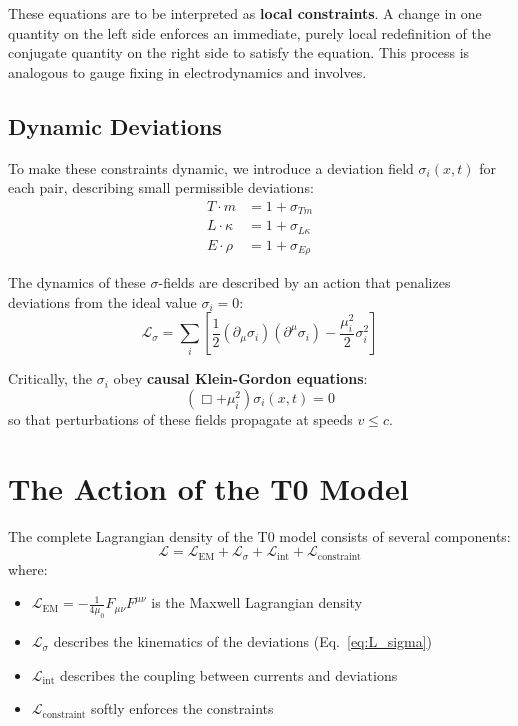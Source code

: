 	These equations are to be interpreted as \textbf{local constraints}. A change in one quantity on the left side enforces an immediate, purely local redefinition of the conjugate quantity on the right side to satisfy the equation. This process is analogous to gauge fixing in electrodynamics and involves.
	
	\subsection{Dynamic Deviations}
	To make these constraints dynamic, we introduce a deviation field $\sigma_i(x,t)$ for each pair, describing small permissible deviations:
	\begin{align}
		T \cdot m &= 1 + \sigma_{Tm} \label{eq:sigma_tm} \\
		L \cdot \kappa &= 1 + \sigma_{L\kappa} \label{eq:sigma_lk} \\
		E \cdot \rho &= 1 + \sigma_{E\rho} \label{eq:sigma_er}
	\end{align}
	
	The dynamics of these $\sigma$-fields are described by an action that penalizes deviations from the ideal value $\sigma_i = 0$:
	\begin{equation}
		\mathcal{L}_{\sigma} = \sum_i \left[ \frac{1}{2} (\partial_\mu \sigma_i)(\partial^\mu \sigma_i) - \frac{\mu_i^2}{2} \sigma_i^2 \right] \label{eq:L_sigma}
	\end{equation}
	
	Critically, the $\sigma_i$ obey \textbf{causal Klein-Gordon equations}:
	\begin{equation}
		(\Box + \mu_i^2) \sigma_i(x,t) = 0 \label{eq:kg}
	\end{equation}
	so that perturbations of these fields propagate at speeds $v \leq c$.
	
	\section{The Action of the T0 Model}
	The complete Lagrangian density of the T0 model consists of several components:
	\begin{equation}
		\mathcal{L} = \mathcal{L}_{\text{EM}} + \mathcal{L}_{\sigma} + \mathcal{L}_{\text{int}} + \mathcal{L}_{\text{constraint}} \label{eq:full_L}
	\end{equation}
	where:
	\begin{itemize}
		\item $\mathcal{L}_{\text{EM}} = -\frac{1}{4\mu_0} F_{\mu\nu} F^{\mu\nu}$ is the Maxwell Lagrangian density
		\item $\mathcal{L}_{\sigma}$ describes the kinematics of the deviations (Eq.~\ref{eq:L_sigma})
		\item $\mathcal{L}_{\text{int}}$ describes the coupling between currents and deviations
		\item $\mathcal{L}_{\text{constraint}}$ softly enforces the constraints
	\end{itemize}
	
